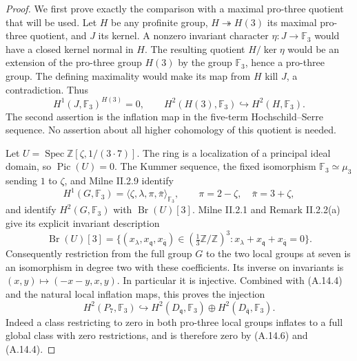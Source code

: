 \begin{proof}
We first prove exactly the comparison with a maximal pro-three
quotient that will be used. Let $H$ be any profinite group,
$H\twoheadrightarrow H(3)$ its maximal pro-three quotient, and
$J$ its kernel. A nonzero invariant character
$\eta:J\to\mathbb F_3$ would have a closed kernel normal in $H$.
The resulting quotient $H/\ker\eta$ would be an extension of the
pro-three group $H(3)$ by the group $\mathbb F_3$, hence a pro-three
group. The defining maximality would make its map from $H$ kill
$J$, a contradiction. Thus
\[
 H^1(J,\mathbb F_3)^{H(3)}=0,
 \qquad
 H^2(H(3),\mathbb F_3)\hookrightarrow H^2(H,\mathbb F_3).
 \tag{A.14.4}
\]
The second assertion is the inflation map in the five-term
Hochschild--Serre sequence. No assertion about all higher
cohomology of this quotient is needed.

Let $U=\operatorname{Spec}\mathbb Z[\zeta,1/(3\cdot7)]$.
The ring is a localization of a principal ideal domain, so
$\operatorname{Pic}(U)=0$. The Kummer sequence, the fixed
isomorphism $\mathbb F_3\simeq\mu_3$ sending $1$ to $\zeta$,
and Milne II.2.9 \cite{MilneADT} identify
\[
 H^1(G,\mathbb F_3)
    =\langle\zeta,\lambda,\pi,\bar\pi\rangle_{\mathbb F_3},
 \qquad \pi=2-\zeta,\quad\bar\pi=3+\zeta,
 \tag{A.14.5}
\]
and identify $H^2(G,\mathbb F_3)$ with
$\operatorname{Br}(U)[3]$. Milne II.2.1 and Remark II.2.2(a)
give its explicit invariant description
\[
 \operatorname{Br}(U)[3]=
 \{(x_\lambda,x_{\mathfrak q},x_{\bar{\mathfrak q}})
       \in(\tfrac13\mathbb Z/\mathbb Z)^3:
          x_\lambda+x_{\mathfrak q}+x_{\bar{\mathfrak q}}=0\}.
 \tag{A.14.6}
\]
Consequently restriction from the full group $G$ to the two
local groups at seven is an isomorphism in degree two with these
coefficients. Its inverse on invariants is
$(x,y)\mapsto(-x-y,x,y)$. In particular it is injective.
Combined with (A.14.4) and the natural local inflation maps, this
proves the injection
\[
 H^2(P_7,\mathbb F_3)\hookrightarrow
 H^2(D_{\mathfrak q},\mathbb F_3)
       \oplus H^2(D_{\overline{\mathfrak q}},\mathbb F_3).
 \tag{A.14.7}
\]
Indeed a class restricting to zero in both pro-three local groups
inflates to a full global class with zero restrictions, and is
therefore zero by (A.14.6) and (A.14.4).


\end{proof}
